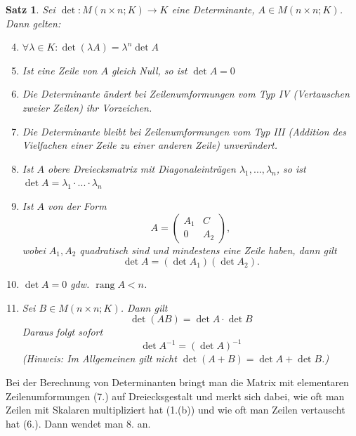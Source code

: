 \documentclass[12pt,a4paper]{article}
\theoremstyle{plain}
\newtheorem{Satz}[Theorem]{Satz}
\numberwithin{equation}{section}
\begin{document}
\begin{Satz}
Sei $\det\colon M(n\times n;K)\rightarrow K$ eine Determinante, $A\in M(n\times n;K)$. Dann gelten:
\begin{enumerate}
\setcounter{enumi}{3}
\item $\forall \lambda\in K\colon \det (\lambda A)=\lambda^n\det A$
\item Ist eine Zeile von $A$ gleich Null, so ist $\det A=0$
\item Die Determinante ändert bei Zeilenumformungen vom Typ IV (Vertauschen zweier Zeilen) ihr Vorzeichen.
\item Die Determinante bleibt bei Zeilenumformungen vom Typ III (Addition des Vielfachen einer Zeile zu einer anderen Zeile) unverändert.
\item Ist $A$ obere Dreiecksmatrix mit Diagonaleinträgen $\lambda_1,...,\lambda_n$, so ist $\det A=\lambda_1\cdot...\cdot\lambda_n$
\item Ist $A$ von der Form
\[A=\begin{pmatrix} A_1&C\\0&A_2\end{pmatrix},\]
wobei $A_1,A_2$ quadratisch sind und mindestens eine Zeile haben, dann gilt
\[\det A=(\det A_1)(\det A_2).\]
\item $\det A=0$ gdw. $\operatorname{rang} A<n$.
\item Sei $B\in M(n\times n;K)$. Dann gilt
\[\det(AB)=\det A\cdot\det B\]
Daraus folgt sofort
\[\det A^{-1}=(\det A)^{-1}\]
(Hinweis: Im Allgemeinen gilt nicht $\det(A+B)=\det A +\det B$.)
\end{enumerate}
\end{Satz}
Bei der Berechnung von Determinanten bringt man die Matrix mit elementaren Zeilenumformungen (7.) auf Dreiecksgestalt und merkt sich dabei, wie oft man Zeilen mit Skalaren multipliziert hat (1.(b)) und wie oft man Zeilen vertauscht hat (6.). Dann wendet man 8. an.
\end{document}
